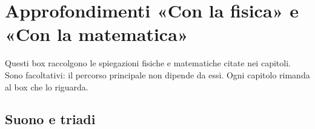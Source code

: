 \appendix

\chapter{Approfondimenti «Con la fisica» e «Con la matematica»}
\label{app:approfondimenti}

Questi box raccolgono le spiegazioni fisiche e matematiche citate nei capitoli. Sono facoltativi: il percorso principale non dipende da essi. Ogni capitolo rimanda al box che lo riguarda.

\section*{Suono e triadi}

